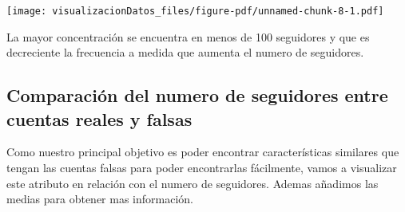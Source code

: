 \documentclass[
  letterpaper,
  DIV=11,
  numbers=noendperiod]{scrreprt}
\begin{document}
\texttt{[image: visualizacionDatos\_files/figure-pdf/unnamed-chunk-8-1.pdf]}

La mayor concentración se encuentra en menos de 100 seguidores y que es
decreciente la frecuencia a medida que aumenta el numero de seguidores.

\subsection{Comparación del numero de seguidores entre cuentas reales y
falsas}\label{comparaciuxf3n-del-numero-de-seguidores-entre-cuentas-reales-y-falsas}

Como nuestro principal objetivo es poder encontrar características
similares que tengan las cuentas falsas para poder encontrarlas
fácilmente, vamos a visualizar este atributo en relación con el numero
de seguidores. Ademas añadimos las medias para obtener mas información.
\end{document}
